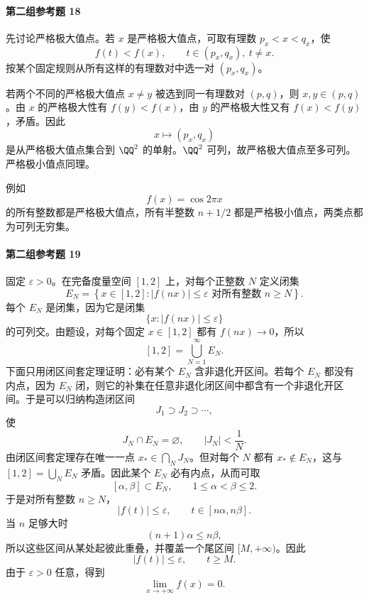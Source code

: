 \paragraph{第二组参考题 18}
\begin{xsolution}
先讨论严格极大值点。若 $x$ 是严格极大值点，可取有理数 $p_x< x<q_x$，使
\[
 f(t)<f(x),
 \qquad t\in(p_x,q_x),\ t\ne x.
\]
按某个固定规则从所有这样的有理数对中选一对 $(p_x,q_x)$。

若两个不同的严格极大值点 $x\ne y$ 被选到同一有理数对 $(p,q)$，则 $x,y\in(p,q)$。由 $x$ 的严格极大性有 $f(y)<f(x)$，由 $y$ 的严格极大性又有 $f(x)<f(y)$，矛盾。因此
\[
 x\longmapsto(p_x,q_x)
\]
是从严格极大值点集合到 $\QQ^2$ 的单射。$\QQ^2$ 可列，故严格极大值点至多可列。严格极小值点同理。

例如
\[
 f(x)=\cos2\pi x
\]
的所有整数都是严格极大值点，所有半整数 $n+1/2$ 都是严格极小值点，两类点都为可列无穷集。
\end{xsolution}

\paragraph{第二组参考题 19}
\begin{xsolution}
固定 $\varepsilon>0$。在完备度量空间 $[1,2]$ 上，对每个正整数 $N$ 定义闭集
\[
 E_N=\left\{x\in[1,2]:|f(nx)|\le\varepsilon
 \text{ 对所有整数 }n\ge N\right\}.
\]
每个 $E_N$ 是闭集，因为它是闭集
\[
 \{x:|f(nx)|\le\varepsilon\}
\]
的可列交。由题设，对每个固定 $x\in[1,2]$ 都有 $f(nx)\to0$，所以
\[
 [1,2]=\bigcup_{N=1}^\infty E_N.
\]
下面只用闭区间套定理证明：必有某个 $E_N$ 含非退化开区间。若每个 $E_N$ 都没有内点，因为 $E_N$ 闭，则它的补集在任意非退化闭区间中都含有一个非退化开区间。于是可以归纳构造闭区间
\[
 J_1\supset J_2\supset\cdots,
\]
使
\[
 J_N\cap E_N=\varnothing,
 \qquad |J_N|<\frac1N.
\]
由闭区间套定理存在唯一一点 $x_*\in\bigcap_NJ_N$。但对每个 $N$ 都有 $x_*\notin E_N$，这与 $[1,2]=\bigcup_NE_N$ 矛盾。因此某个 $E_N$ 必有内点，从而可取
\[
 [\alpha,\beta]\subset E_N,
 \qquad 1\le\alpha<\beta\le2.
\]
于是对所有整数 $n\ge N$，
\[
 |f(t)|\le\varepsilon,
 \qquad t\in[n\alpha,n\beta].
\]
当 $n$ 足够大时
\[
 (n+1)\alpha\le n\beta,
\]
所以这些区间从某处起彼此重叠，并覆盖一个尾区间 $[M,+\infty)$。因此
\[
 |f(t)|\le\varepsilon,
 \qquad t\ge M.
\]
由于 $\varepsilon>0$ 任意，得到
\[
 \lim_{x\to+\infty}f(x)=0.
\]
\end{xsolution}

